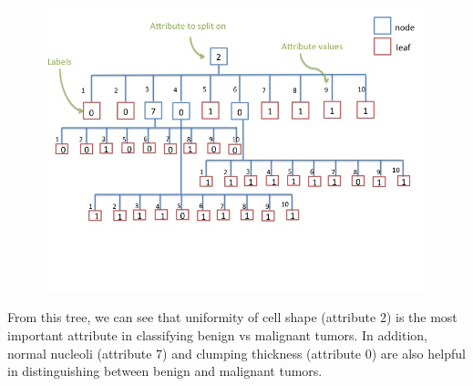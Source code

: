 \documentclass[12pt]{article}
\begin{document}
\begin{enumerate}
	\begin{figure}[H]
	\begin{center}
	\includegraphics[width=110mm]{4.jpg}
	\end{center}
	\end{figure}
From this tree, we can see that uniformity of cell shape (attribute 2) is the most important attribute in classifying benign vs malignant tumors. In addition, normal nucleoli (attribute 7) and clumping thickness (attribute 0) are also helpful in distinguishing between benign and malignant tumors. 

\end{enumerate}
\end{document}
